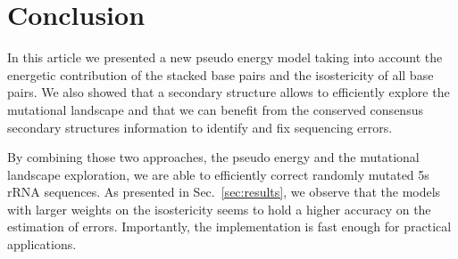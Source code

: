 \section{Conclusion}
\label{sec:conclusion}

In this article we presented a new 
 pseudo energy model taking into account the energetic contribution 
of the stacked base pairs and the isostericity of all base pairs. 
We also showed that a secondary structure allows to efficiently
explore the mutational landscape and that we can benefit from the
 conserved consensus secondary structures  information
to identify and fix sequencing errors.


By combining those two approaches, the pseudo energy and the 
mutational landscape exploration, we are able  to efficiently 
correct randomly mutated 5s rRNA sequences. 
As presented in Sec.~\ref{sec:results},
we observe that the models
with larger weights on the
isostericity seems to hold a higher accuracy on the estimation of errors.
Importantly, the implementation is fast enough for practical applications.